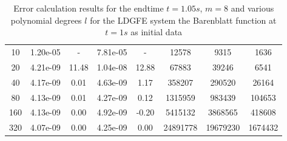\documentclass[a4paper,12pt]{paper}
\begin{document}
\begin{table}[h]
\begin{minipage}[t]{0.7\linewidth}
{\begin{tabular}{cccccccc}
				\hline
				10 & 1.20e-05 & - & 7.81e-05 & - & 12578 & 9315 & 1636\\
				20 & 4.21e-09 & 11.48 & 1.04e-08 & 12.88 & 67883 & 39246 & 6541\\
				40 & 4.17e-09 & 0.01 & 4.63e-09 & 1.17 &358207& 290520 & 26164\\
				80 & 4.13e-09 & 0.01 & 4.27e-09& 0.12 & 1315959 & 983439 & 104653\\
				160 & 4.13e-09  & 0.00 & 4.92e-09 & -0.20 & 5415132 & 3868565 & 418608\\
				320 &  4.07e-09 & 0.00 & 4.25e-09 & 0.00 & 24891778  & 19679230 & 1674432\\
				\hline
		\end{tabular}}
		\caption*{Error calculation results for $l=5,~m=8$}
		\label{table:BBM8P5}
	\end{minipage}
	\caption{Error calculation results for the endtime $t=1.05s$, $m=8$ and various polynomial degrees $l$ for the LDGFE system the Barenblatt function at $t=1s$ as initial data}
	\label{TBL:APSHITERRORCALC}
\end{table}
\end{document}
